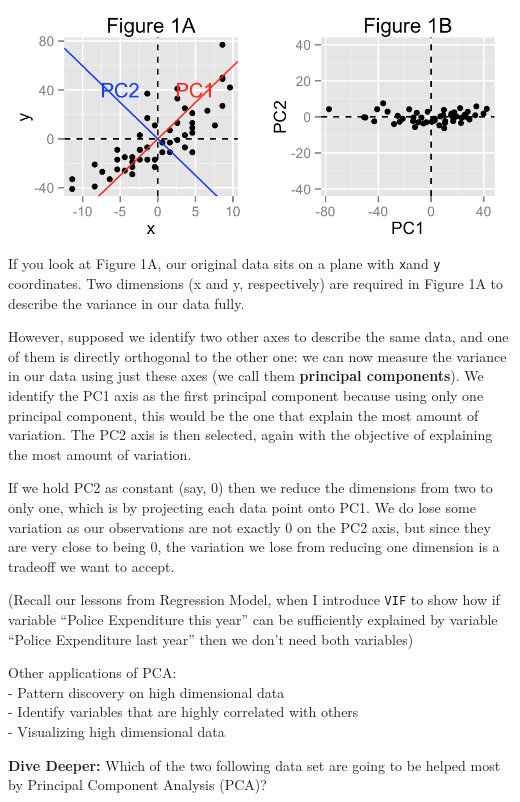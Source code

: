 \documentclass[]{article}
\begin{document}
\includegraphics{assets/pca1.png} If you look at Figure 1A, our original
data sits on a plane with \texttt{x}and \texttt{y} coordinates. Two
dimensions (x and y, respectively) are required in Figure 1A to describe
the variance in our data fully.

However, supposed we identify two other axes to describe the same data,
and one of them is directly orthogonal to the other one: we can now
measure the variance in our data using just these axes (we call them
\textbf{principal components}). We identify the PC1 axis as the first
principal component because using only one principal component, this
would be the one that explain the most amount of variation. The PC2 axis
is then selected, again with the objective of explaining the most amount
of variation.

If we hold PC2 as constant (say, 0) then we reduce the dimensions from
two to only one, which is by projecting each data point onto PC1. We do
lose some variation as our observations are not exactly 0 on the PC2
axis, but since they are very close to being 0, the variation we lose
from reducing one dimension is a tradeoff we want to accept.

(Recall our lessons from Regression Model, when I introduce \texttt{VIF}
to show how if variable ``Police Expenditure this year'' can be
sufficiently explained by variable ``Police Expenditure last year'' then
we don't need both variables)

Other applications of PCA:\\
- Pattern discovery on high dimensional data\\
- Identify variables that are highly correlated with others\\
- Visualizing high dimensional data

\textbf{Dive Deeper:} Which of the two following data set are going to
be helped most by Principal Component Analysis (PCA)?
\end{document}
